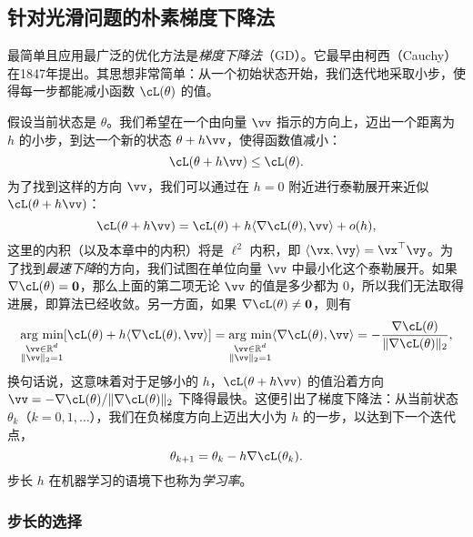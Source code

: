 \documentclass[../../book-main.tex]{subfiles}
\begin{document}
\subsection{针对光滑问题的朴素梯度下降法}

最简单且应用最广泛的优化方法是\textit{梯度下降法}（GD）。它最早由柯西（Cauchy）在1847年提出。其思想非常简单：从一个初始状态开始，我们迭代地采取小步，使得每一步都能减小函数 \(\cL(\theta)\) 的值。

假设当前状态是 \(\theta\)。我们希望在一个由向量 \(\vv\) 指示的方向上，迈出一个距离为 \(h\) 的小步，到达一个新的状态 \(\theta + h\vv\)，使得函数值减小：
\begin{equation}
    \cL(\theta + h\vv) \leq \cL(\theta).
\end{equation}
为了找到这样的方向 \(\vv\)，我们可以通过在 \(h = 0\) 附近进行泰勒展开来近似 \(\cL(\theta + h\vv)\)：
\begin{equation}
    \cL(\theta + h\vv) = \cL(\theta) + h\ip{\nabla \cL(\theta)}{\vv} + o(h),
\end{equation}
这里的内积（以及本章中的内积）将是 \(\ell^{2}\) 内积，即 \(\ip{\vx}{\vy} = \vx^{\top}\vy\)。为了找到\textit{最速下降}的方向，我们试图在单位向量 \(\vv\) 中最小化这个泰勒展开。如果 \(\nabla \cL(\theta) = \vzero\)，那么上面的第二项无论 \(\vv\) 的值是多少都为 \(0\)，所以我们无法取得进展，即算法已经收敛。另一方面，如果 \(\nabla \cL(\theta) \neq \vzero\)，则有
\begin{equation}\label{eq:steepest_descent_l2_norm}
    \argmin_{\substack{\vv \in \R^{d} \\ \norm{\vv}_{2} = 1}} [\cL(\theta) + h\ip{\nabla \cL(\theta)}{\vv}] = \argmin_{\substack{\vv \in \R^{d} \\ \norm{\vv}_{2} = 1}} \ip{\nabla \cL(\theta)}{\vv} = -\frac{\nabla \cL(\theta)}{\norm{\nabla \cL(\theta)}_{2}},
\end{equation}
换句话说，这意味着对于足够小的 \(h\)，\(\cL(\theta + h\vv)\) 的值沿着方向 \(\vv = -\nabla \cL(\theta) / \norm{\nabla \cL(\theta)}_{2}\) 下降得最快。这便引出了梯度下降法：从当前状态 \(\theta_k\)（\(k=0, 1, \ldots\)），我们在负梯度方向上迈出大小为 \(h\) 的一步，以达到下一个迭代点，
\begin{equation}
    \theta_{k+1} = \theta_k - h \nabla \cL(\theta_k). 
\end{equation}
步长 \(h\) 在机器学习的语境下也称为\textit{学习率}。

\subsubsection{步长的选择}
\end{document}
